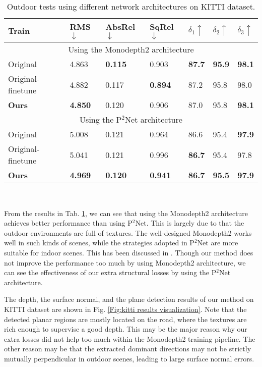 \documentclass[10pt,twocolumn,letterpaper]{article}
\newcommand{\Tab}[1]{Tab. \ref{#1}}
\begin{document}
\begin{table}[h]
\scriptsize
	\centering
	\begin{tabularx}{0.48\textwidth}{|l|XXX|XXX|}
		\hline
		Train & RMS$\downarrow$ & AbsRel$\downarrow$ & SqRel$\downarrow$ & $\delta_1\uparrow$ & $\delta_2\uparrow$ & $\delta_3\uparrow$ \\
		\hline
		\hline
		\multicolumn{7}{|c|}{Using the Monodepth2 architecture} \\
		\hline
		Original & 4.863 & \textbf{0.115} & 0.903 & \textbf{87.7} & \textbf{95.9}  & \textbf{98.1} \\
		Original-finetune & 4.882 & 0.117 & \textbf{0.894} & 87.2 & 95.8  & 98.0 \\
		\textbf{Ours}  & \textbf{4.850}  & 0.120 & 0.906 & 87.0  & 95.8  & \textbf{98.1} \\
		\hline
		\hline
		\multicolumn{7}{|c|}{Using the P$^{2}$Net architecture} \\
		\hline
		Original & 5.008 & 0.121 & 0.964 &  86.6 &  95.4 & \textbf{97.9} \\
		Original-finetune & 5.041 & 0.121 & 0.996 & \textbf{86.7}  & 95.4  & 97.8  \\
		\textbf{Ours} & \textbf{4.969} & \textbf{0.120} & \textbf{0.941} & \textbf{86.7}  & \textbf{95.5}  & \textbf{97.9} \\
		\hline
	\end{tabularx}
\\
	\caption{Outdoor tests using different network architectures on KITTI dataset. }
	\label{tab:diff baseline KITTI}  
\end{table} 


From the results in \Tab{tab:diff baseline KITTI}, we can see that using
the Monodepth2 \cite{godard2019digging} architecture achieves better performance than using P$^2$Net.
This is largely due to that the outdoor environments are full of textures. The well-designed Monodepth2 works well in such kinds of scenes, while the strategies adopted in P$^2$Net are more suitable for indoor scenes. This has been discussed in \cite{yu2020p}. Though our method does not improve the performance too much by using Monodepth2 architecture, we can see the effectiveness of our extra structural losses by using the P$^2$Net architecture.

The depth, the surface normal, and the plane detection results of our method on KITTI dataset are shown in Fig. \ref{Fig:kitti results visualization}. Note that the detected planar regions are mostly located on the road, where the textures are rich enough to supervise a good depth. This may be the major reason why our extra losses did not help too much within the Monodepth2 training pipeline. The other reason may be that the extracted dominant directions may not be strictly mutually perpendicular in outdoor scenes, leading to large surface normal errors.
\end{document}
